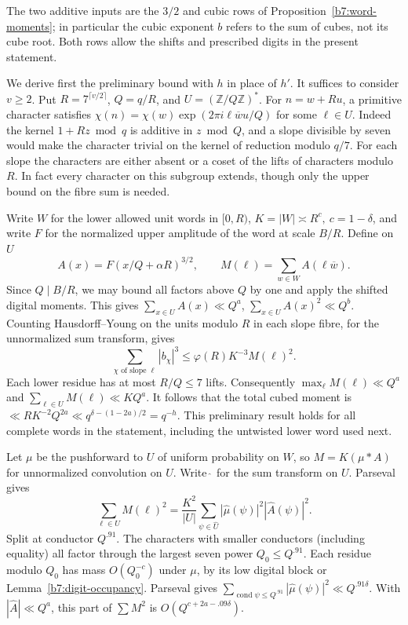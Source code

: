 \documentclass[11pt,a4paper]{article}
\theoremstyle{paperplain}
\numberwithin{equation}{section}
\begin{document}
The two additive inputs are the $3/2$ and cubic rows of
Proposition~\ref{b7:word-moments}; in particular the cubic exponent
$b$ refers to the sum of cubes, not its cube root. Both rows allow the
shifts and prescribed digits in the present statement.

We derive first the preliminary bound with \(h\) in place of \(h'\).
It suffices to consider \(v\ge2\). Put \(R=7^{\lceil v/2\rceil}\),
\(Q=q/R\), and \(U=(\mathbb Z/Q\mathbb Z)^*\).
For \(n=w+Ru\), a primitive character satisfies
\(\chi(n)=\chi(w)\exp(2\pi i\ell\overline w u/Q)\) for some
\(\ell\in U\). Indeed the kernel \(1+Rz\bmod q\) is additive in
\(z\bmod Q\), and a slope divisible by seven would make the character
trivial on the kernel of reduction modulo \(q/7\). For each slope the
characters are either absent or a coset of the lifts of characters
modulo \(R\). In fact every character on this subgroup extends, though
only the upper bound on the fibre sum is needed.

Write \(W\) for the lower allowed unit words in \([0,R)\),
\(K=|W|\asymp R^c,\ c=1-\delta\), and write \(F\) for the normalized
upper amplitude of the word at scale \(B/R\). Define on \(U\)
\[
 A(x)=F(x/Q+\alpha R)^{3/2},\qquad
 M(\ell)=\sum_{w\in W} A(\ell\overline w).
\]
Since \(Q\mid B/R\), we may bound all factors above \(Q\) by one
and apply the shifted digital moments. This gives
\(\sum_{x\in U} A(x)\ll Q^a\), \(\sum_{x\in U} A(x)^2\ll Q^b\).
Counting Hausdorff--Young on the units modulo \(R\) in each slope
fibre, for the unnormalized sum transform, gives
\[
 \sum_{\chi\text{ of slope }\ell}|b_\chi|^3
       \le \varphi(R)K^{-3} M(\ell)^2 .
\]
Each lower residue has at most \(R/Q\le7\) lifts. Consequently
\(\max_\ell M(\ell)\ll Q^a\) and
\(\sum_{\ell\in U}M(\ell)\ll KQ^a\).
It follows that the total cubed moment is
\(\ll R K^{-2}Q^{2a}\ll q^{\delta-(1-2a)/2}=q^{-h}\).
This preliminary result holds for all complete words in the statement,
including the untwisted lower word used next.

Let \(\mu\) be the pushforward to \(U\) of uniform probability on
\(W\), so \(M=K(\mu*A)\) for unnormalized convolution on \(U\).
Write \(\widehat{\ }\) for the sum transform on \(U\). Parseval gives
\[
 \sum_{\ell\in U}M(\ell)^2=
 \frac{K^2}{|U|}\sum_{\psi\in\widehat U}
                  |\widehat\mu(\psi)|^2|\widehat A(\psi)|^2 .
\]
Split at conductor \(Q^{.91}\). The characters with smaller
conductors (including equality) all factor through the largest seven
power \(Q_0\le Q^{.91}\). Each residue modulo \(Q_0\) has mass
\(O(Q_0^{-c})\) under \(\mu\), by its low digital block or
Lemma~\ref{b7:digit-occupancy}. Parseval gives
\(\sum_{\operatorname{cond}\psi\le Q^{.91}}|\widehat\mu(\psi)|^2
\ll Q^{.91\delta}\). With \(|\widehat A|\ll Q^a\), this part of
\(\sum M^2\) is \(O(Q^{c+2a-.09\delta})\).
\end{document}
